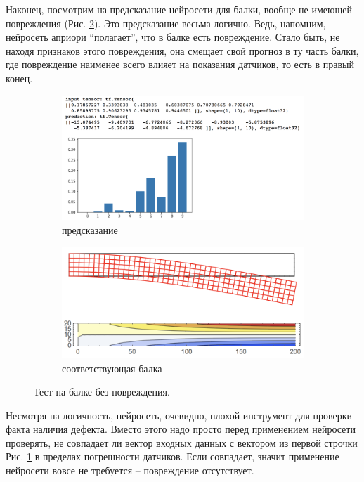 \documentclass[a4paper,12pt]{article}
\theoremstyle{remark}
\begin{document}
	Наконец, посмотрим на предсказание нейросети для балки, вообще не имеющей повреждения (Рис. \ref{fig:nn1_no_damage}). Это предсказание весьма логично. Ведь, напомним, нейросеть априори ``полагает'', что в балке есть повреждение. Стало быть, не находя признаков этого повреждения, она смещает свой прогноз в ту часть балки, где повреждение наименее всего влияет на показания датчиков, то есть в правый конец.
	\begin{figure}[h]
		\begin{subfigure}[t]{0.6\textwidth}
			\includegraphics[width=\linewidth]{nn1_no_damage.png}
			\caption{предсказание}
			\label{fig:nn1_no_damage_a}
		\end{subfigure}
		\begin{subfigure}[t]{0.4\textwidth}
			\includegraphics[width=\linewidth]{ds1_no_damage.png}
			\caption{соответствующая балка}
		\end{subfigure}
		\caption{Тест на балке без повреждения.}
		\label{fig:nn1_no_damage}
	\end{figure}

	Несмотря на логичность, нейросеть, очевидно, плохой инструмент для проверки факта наличия дефекта. Вместо этого надо просто перед применением нейросети проверять, не совпадает ли вектор входных данных с вектором из первой строчки Рис. \ref{fig:nn1_no_damage_a} в пределах погрешности датчиков. Если совпадает, значит применение нейросети вовсе не требуется -- повреждение отсутствует.
	
\end{document}

